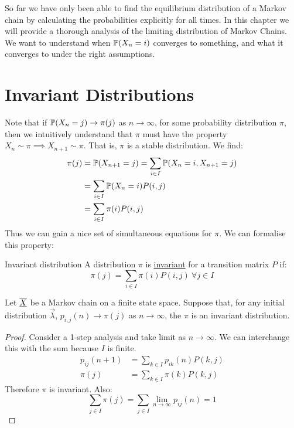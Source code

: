 \documentclass[../Main.tex]{subfiles}
\begin{document}
So far we have only been able to find the equilibrium distribution of a Markov chain by calculating the probabilities explicitly for all times. In this chapter we will provide a thorough analysis of the limiting distribution of Markov Chains.
We want to understand when $\P(X_n = i)$ converges to something, and what it converges to under the right assumptions.

\section{Invariant Distributions}
Note that if $\P(X_n = j) \to \pi(j)$ as $n \to \infty$, for some probability distribution $\pi$, then we intuitively understand that $\pi$ must have the property $X_n \sim \pi \implies X_{n+1} \sim \pi$. That is, $\pi$ is a stable distribution. We find:
\begin{align*}
    \pi(j) &= \P(X_{n+1} = j) = \sum_{i \in I} \P(X_n = i, X_{n+1} = j) \\
    &= \sum_{i \in I} \P(X_n = i) P(i, j) \\
    &= \sum_{i \in I} \pi(i) P(i, j)
\end{align*}
Thus we can gain a nice set of simultaneous equations for $\pi$. We can formalise this property:
\begin{definition}{Invariant distribution}
    A distribution $\pi$ is \underline{invariant} for a transition matrix $P$ if:
    \begin{equation*}
        \pi(j) = \sum_{i \in I} \pi(i) P(i, j)~\forall j \in I
    \end{equation*}
\end{definition}
\begin{theorem}
    Let $\chain{X}$ be a Markov chain on a finite state space. Suppose that, for any initial distribution $\vec{\lambda}$, $p_{i, j}(n) \to \pi(j)$ as $n \to \infty$, the $\pi$ is an invariant distribution.
    \label{thmLimitIsInvariant}
\end{theorem}
\begin{proof}
    Consider a 1-step analysis and take limit as $n \to \infty$. We can interchange this with the sum because $I$ is finite.
    \begin{align*}
        p_{ij}(n+1) &= \sum_{k \in I} p_{ik}(n) P(k, j) \\
        \pi(j) &= \sum_{k \in I} \pi(k) P(k, j)
    \end{align*}
    Therefore $\pi$ is invariant. Also:
    \begin{equation*}
        \sum_{j \in I}\pi(j) = \sum_{j \in I} \lim_{n \to \infty} p_{ij}(n) = 1
    \end{equation*}
\end{proof}
\end{document}
